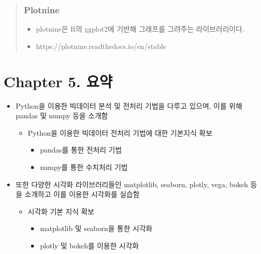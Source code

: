 \documentclass[11pt]{article}
\providecommand{\tightlist}{%
      \setlength{\itemsep}{0pt}\setlength{\parskip}{0pt}}
\begin{document}
\begin{quote}
\hypertarget{plotnine}{%
\subsubsection{Plotnine}\label{plotnine}}

\begin{itemize}
\tightlist
\item
  plotnine은 R의 ggplot2에 기반해 그래프를 그려주는 라이브러리이다.
\item
  https://plotnine.readthedocs.io/en/stable
\end{itemize}
\end{quote}

    \hypertarget{chapter-5.-uxc694uxc57d}{%
\section{Chapter 5. 요약}\label{chapter-5.-uxc694uxc57d}}

\begin{itemize}
\tightlist
\item
  Python을 이용한 빅데이터 분석 및 전처리 기법을 다루고 있으며, 이를
  위해 pandas 및 numpy 등을 소개함

  \begin{itemize}
  \tightlist
  \item
    Python을 이용한 빅데이터 전처리 기법에 대한 기본지식 확보

    \begin{itemize}
    \tightlist
    \item
      pandas를 통한 전처리 기법
    \item
      numpy를 통한 수치처리 기법
    \end{itemize}
  \end{itemize}
\item
  또한 다양한 시각화 라이브러리들인 matplotlib, seaborn, plotly, vega,
  bokeh 등을 소개하고 이를 이용한 시각화를 실습함

  \begin{itemize}
  \tightlist
  \item
    시각화 기본 지식 확보

    \begin{itemize}
    \tightlist
    \item
      matplotlib 및 seaborn을 통한 시각화
    \item
      plotly 및 bokeh를 이용한 시각화
    \end{itemize}
  \end{itemize}
\end{itemize}


    
    
    
    
\end{document}
